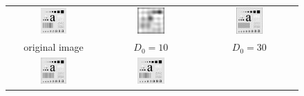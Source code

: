 \documentclass[11pt,a4paper]{article}
\begin{document}
\begin{figure}[!htbp]
	\centering
	\begin{tabular}{ccc} 
		\includegraphics[width=0.3\textwidth]{pro3/org}&
		\includegraphics[width=0.3\textwidth]{pro3/ILPF/ILPF_10}&
		\includegraphics[width=0.3\textwidth]{pro3/ILPF/ILPF_30} \\
		original image &  $D_0=10$ &  $D_0=30$\\
		\includegraphics[width=0.3\textwidth]{pro3/ILPF/ILPF_60}&
		\includegraphics[width=0.3\textwidth]{pro3/ILPF/ILPF_160}&

\end{tabular}
\end{figure}
\end{document}
